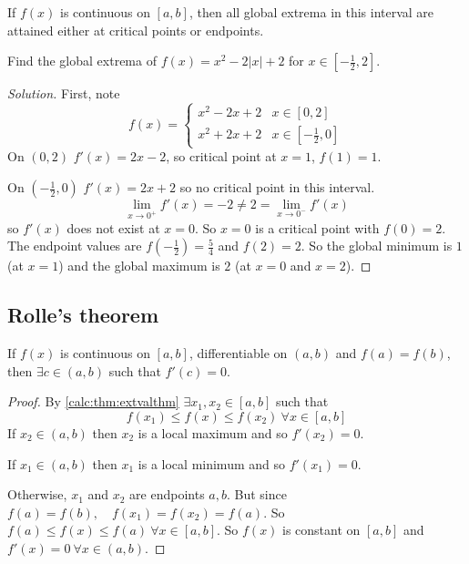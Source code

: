 \documentclass[10pt, a4paper]{article}
\begin{document}
If $f(x)$ is continuous on $[a, b]$,
then all global extrema in this interval are attained either at critical points or endpoints.

\begin{example}
    Find the global extrema of $f(x) = x ^ 2 - 2|x| + 2$ for $x \in \left[-\frac{1}{2}, 2\right]$.
    \begin{proof}[Solution]\renewcommand{\qedsymbol}{}
        First, note
        \[
        f(x) = \begin{cases}
            x ^ 2 - 2x + 2 & x \in [0, 2] \\
            x ^ 2 + 2x + 2 & x \in \left[-\frac{1}{2}, 0\right]
        \end{cases}
        \]
        On $(0, 2)$ $f'(x) = 2x - 2$,
        so critical point at $x = 1$, $f(1) = 1$.

        On $\left(-\frac{1}{2}, 0\right)$ $f'(x) = 2x + 2$ so no critical point in this interval.
        \[
        \lim_{x \rightarrow 0^{+}}f'(x) = -2 \neq 2 = \lim_{x \rightarrow 0^{-}}f'(x)
        \]
        so $f'(x)$ does not exist at $x = 0$.
        So $x = 0$ is a critical point with $f(0) = 2$.
        The endpoint values are $f\left(-\frac{1}{2}\right) = \frac{5}{4}$ and $f(2) = 2$.
        So the global minimum is $1$ (at $x = 1$) and the global maximum is $2$ (at $x = 0$ and $x = 2$).
    \end{proof}
\end{example}

\subsection{Rolle's theorem}

\begin{theorem}\label{calc:thm:rolle}
    If $f(x)$ is continuous on $[a, b]$, differentiable on $(a, b)$ and $f(a) = f(b)$, then $\exists c \in (a, b)$ such that $f'(c) = 0$.
    \begin{proof}
        By \autoref{calc:thm:extvalthm} $\exists x_1, x_2 \in [a, b]$ such that
        \[
        f(x_1) \leq f(x) \leq f(x_2)\ \forall x \in [a, b]
        \]
        If $x_2 \in (a, b)$ then $x_2$ is a local maximum and so $f'(x_2) = 0$.

        If $x_1 \in (a, b)$ then $x_1$ is a local minimum and so $f'(x_1) = 0$.

        Otherwise, $x_1$ and $x_2$ are endpoints $a, b$.
        But since $f(a) = f(b),\quad f(x_1) = f(x_2) = f(a)$.
        So $f(a) \leq f(x) \leq f(a)\ \forall x \in [a, b]$.
        So $f(x)$ is constant on $[a, b]$ and $f'(x) = 0\ \forall x \in (a, b)$.
    \end{proof}
\end{theorem}
\end{document}
